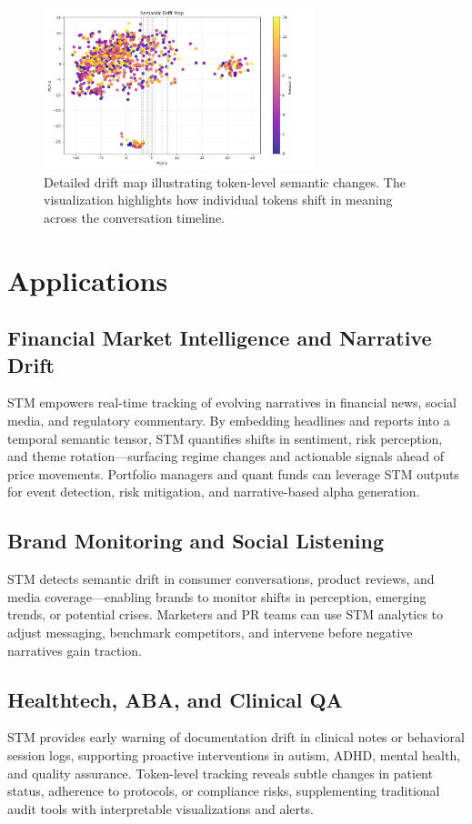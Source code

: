 \documentclass[11pt]{article}
\begin{document}
\begin{figure}[h]
    \centering
    \includegraphics[width=0.7\textwidth]{demo_drift_map.png}
    \caption{Detailed drift map illustrating token-level semantic changes. The visualization highlights how individual tokens shift in meaning across the conversation timeline.}
    \label{fig:drift_map}
\end{figure}

\section{Applications}

\subsection{Financial Market Intelligence and Narrative Drift}
STM empowers real-time tracking of evolving narratives in financial news, social media, and regulatory commentary. By embedding headlines and reports into a temporal semantic tensor, STM quantifies shifts in sentiment, risk perception, and theme rotation—surfacing regime changes and actionable signals ahead of price movements. Portfolio managers and quant funds can leverage STM outputs for event detection, risk mitigation, and narrative-based alpha generation.

\subsection{Brand Monitoring and Social Listening}
STM detects semantic drift in consumer conversations, product reviews, and media coverage—enabling brands to monitor shifts in perception, emerging trends, or potential crises. Marketers and PR teams can use STM analytics to adjust messaging, benchmark competitors, and intervene before negative narratives gain traction.

\subsection{Healthtech, ABA, and Clinical QA}
STM provides early warning of documentation drift in clinical notes or behavioral session logs, supporting proactive interventions in autism, ADHD, mental health, and quality assurance. Token-level tracking reveals subtle changes in patient status, adherence to protocols, or compliance risks, supplementing traditional audit tools with interpretable visualizations and alerts.
\end{document}
